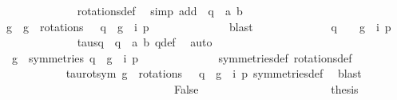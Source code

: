 \begin{isabellebody}
\ \ \ \ \ \ \ \ \ \ \ \ \isamarkupfalse%
\ rotations{\isacharunderscore}def\ \isamarkupfalse%
\ {\isacharparenleft}simp\ add{\isacharcolon}\ {\isacartoucheopen}{\isasymtau}\ q\ {\isacharequal}\ {\isacharparenleft}a{}{\isacharcomma}\ b{}{\isacharparenright}{\isacartoucheclose}{\isacharparenright}\isanewline
\ \ \ \ \ \ \ \ \ \ \isamarkupfalse%
\ \isamarkupfalse%
\ g\ \ {\isachardoublequoteopen}g\ {\isasymin}\ rotations\ {\isasymand}\ {\isasymtau}\ q\ {\isacharequal}\ {\isacharparenleft}g\ {\isasymcirc}\ i{\isacharparenright}\ p{\isachardoublequoteclose}\isanewline
\ \ \ \ \ \ \ \ \ \ \ \ \isamarkupfalse%
\ blast\isanewline
\ \ \ \ \ \ \ \ \ \ \isamarkupfalse%
\ \isamarkupfalse%
\ {\isachardoublequoteopen}q\ {\isacharequal}\ {\isacharparenleft}{\isasymtau}\ {\isasymcirc}\ g\ {\isasymcirc}\ i{\isacharparenright}\ p{\isachardoublequoteclose}\isanewline
\ \ \ \ \ \ \ \ \ \ \ \ \isamarkupfalse%
\ tau{\isacharunderscore}sq\ {\isacartoucheopen}{\isasymtau}\ q\ {\isacharequal}\ {\isacharparenleft}a{}{\isacharcomma}\ b{}{\isacharparenright}{\isacartoucheclose}\ q{\isacharunderscore}def\ \isamarkupfalse%
\ auto\isanewline
\ \ \ \ \ \ \ \ \ \ \isamarkupfalse%
\ \isamarkupfalse%
\ {\isachardoublequoteopen}{\isacharparenleft}{\isasymexists}\ g\ {\isasymin}\ symmetries{\isachardot}\ q\ {\isacharequal}\ {\isacharparenleft}g\ {\isasymcirc}\ i{\isacharparenright}\ p{\isacharparenright}{\isachardoublequoteclose}\isanewline
\ \ \ \ \ \ \ \ \ \ \ \ \isamarkupfalse%
\ symmetries{\isacharunderscore}def\ rotations{\isacharunderscore}def\ \isanewline
\ \ \ \ \ \ \ \ \ \ \isamarkupfalse%
\ tau{\isacharunderscore}rot{\isacharunderscore}sym\ {\isacartoucheopen}g\ {\isasymin}\ rotations\ {\isasymand}\ {\isasymtau}\ q\ {\isacharequal}\ {\isacharparenleft}g\ {\isasymcirc}\ i{\isacharparenright}\ p{\isacartoucheclose}\ symmetries{\isacharunderscore}def\ \isamarkupfalse%
\ blast\ \ \isanewline
\ \ \ \ \ \ \ \ \ \ \isamarkupfalse%
\isanewline
\ \ \ \ \ \ \ \ \isamarkupfalse%
\isanewline
\ \ \ \ \ \ \ \ \ \ \isamarkupfalse%
\ False\isanewline
\ \ \ \ \ \ \ \ \ \isanewline
\ \ \ \ \ \ \ \ \ \ \isamarkupfalse%
\ \isamarkupfalse%
\ {\isacharquery}thesis\ \isamarkupfalse%
\isanewline
\ \ \ \ \ \ \ \ \isamarkupfalse%

\end{isabellebody}
